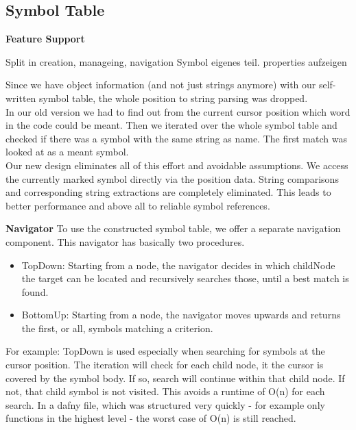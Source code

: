 \subsection{Symbol Table}



\textbf{Feature Support}

Split in creation, manageing, navigation
Symbol eigenes teil.
properties aufzeigen


Since we have object information (and not just strings anymore) with our self-written symbol table,
the whole position to string parsing was dropped. \\

In our old version we had to find out from the current cursor position which word in the code could be meant.
Then we iterated over the whole symbol table and checked if there was a symbol with the same string as name.
The first match was looked at as a meant symbol. \\

Our new design eliminates all of this effort and avoidable assumptions.
We access the currently marked symbol directly via the position data.
String comparisons and corresponding string extractions are completely eliminated.
This leads to better performance and above all to reliable symbol references.


\textbf{Navigator}
To use the constructed symbol table, we offer a separate navigation component.
This navigator has basically two procedures.
\begin{itemize}
\item TopDown: Starting from a node, the navigator decides in which childNode the target can be located and recursively searches those, until a best match is found.
\item BottomUp: Starting from a node, the navigator moves upwards and returns the first, or all, symbols matching a criterion.
\end{itemize}

For example: TopDown is used especially when searching for symbols at the cursor position.
The iteration will check for each child node, it the cursor is covered by the symbol body.
If so, search will continue within that child node.
If not, that child symbol is not visited.
This avoids a runtime of O(n) for each search. 
In a dafny file, which was structured very quickly - for example only functions in the highest level - the worst case of O(n) is still reached. 


